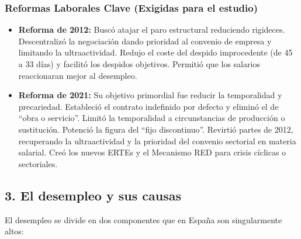 \subsubsection*{Reformas Laborales Clave (Exigidas para el estudio)}

\begin{itemize}
  \item \textbf{Reforma de 2012:} Buscó atajar el paro estructural reduciendo rigideces. Descentralizó la negociación dando prioridad al convenio de empresa y limitando la ultraactividad. Redujo el coste del despido improcedente (de 45 a 33 días) y facilitó los despidos objetivos. Permitió que los salarios reaccionaran mejor al desempleo.

  \item \textbf{Reforma de 2021:} Su objetivo primordial fue reducir la temporalidad y precariedad. Estableció el contrato indefinido por defecto y eliminó el de ``obra o servicio''. Limitó la temporalidad a circunstancias de producción o sustitución. Potenció la figura del ``fijo discontinuo''. Revirtió partes de 2012, recuperando la ultraactividad y la prioridad del convenio sectorial en materia salarial. Creó los nuevos ERTEs y el Mecanismo RED para crisis cíclicas o sectoriales.
\end{itemize}

\subsection*{3. El desempleo y sus causas}

El desempleo se divide en dos componentes que en España son singularmente altos:

